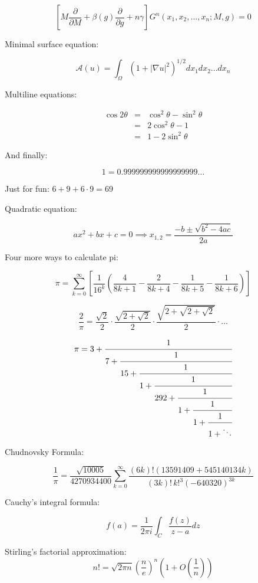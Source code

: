 \documentclass{article}
\begin{document}
\[
\left[M\frac{\partial}{\partial M}+\beta(g)\frac{\partial}{\partial g}+n\gamma\right]G^n(x_1,x_2,...,x_n;M,g)=0
\]

Minimal surface equation:

$$\mathcal{A}(u)=\int_\Omega(1+|\nabla u|^2)^{1/2} dx_1 dx_2 ... dx_n$$ 

Multiline equations:

\begin{eqnarray*}
\cos{2\theta} & = & \cos^2\theta - \sin^2\theta \\
              & = & 2\cos^2\theta - 1 \\
              & = & 1 - 2\sin^2\theta
\end{eqnarray*}

And finally:

$$1=0.999999999999999999\ldots$$

Just for fun: $6 + 9 + 6 \cdot 9 = 69$

Quadratic equation:

\[
  ax^2+bx+c=0 \implies x_{1,2}=\frac{-b\pm\sqrt{b^2-4ac}}{2a}  
\]

Four more ways to calculate pi:

\begin{equation*}
  \pi=\sum_{k=0}^\infty\left[\frac{1}{16^k}\left(\frac{4}{8k+1}-\frac{2}{8k+4}-\frac{1}{8k+5}-\frac{1}{8k+6} \right) \right]
\end{equation*}

\begin{equation*}
  \frac{2}{\pi}=\frac{\sqrt{2}}{2}\cdot\frac{\sqrt{2+\sqrt{2}}}{2}\cdot\frac{\sqrt{2+\sqrt{2+\sqrt{2}}}}{2}\cdot\ldots
\end{equation*}

\begin{equation*}
\pi = 3+\textstyle \cfrac{1}{7+\textstyle \cfrac{1}{15+\textstyle \cfrac{1}{1+\textstyle \cfrac{1}{292+\textstyle \cfrac{1}{1+\textstyle \cfrac{1}{1+\textstyle \cfrac{1}{1+\ddots}}}}}}}
\end{equation*}

Chudnovsky Formula:

\[
\frac{1}{\pi} = \frac{\sqrt{10005}}{4270934400} \sum_{k=0}^\infty \frac{(6k)! (13591409 + 545140134k)}{(3k)!\,k!^3 (-640320)^{3k}}
\]

Cauchy's integral formula:

$$f(a)=\frac{1}{2\pi i}\int_{C} \frac{f(z)}{z-a} dz $$

Stirling's factorial approximation:
$$n! = \sqrt{2 \pi n} \left( \frac{n}{e} \right)^n \left( 1 + O \left( \frac{1}{n} \right) \right)$$
\end{document}
